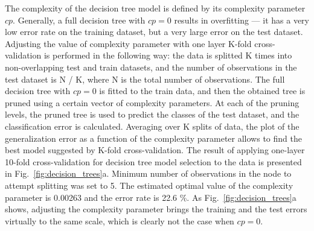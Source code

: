 \documentclass[10pt, paper=a4]{article}
\begin{document}
The complexity of the decision tree model is defined by its complexity
parameter $cp$.  Generally, a full decision tree with $cp = 0$ results
in overfitting --- it has a very low error rate on the training
dataset, but a very large error on the test dataset.  Adjusting the
value of complexity parameter with one layer K-fold cross-validation
is performed in the following way: the data is splitted K times into
non-overlapping test and train datasets, and the number of
observations in the test dataset is N / K, where N is the total number
of observations.  The full decision tree with $cp = 0$ is fitted to
the train data, and then the obtained tree is pruned using a certain
vector of complexity parameters.  At each of the pruning levels, the
pruned tree is used to predict the classes of the test dataset, and
the classification error is calculated.  Averaging over K splits of
data, the plot of the generalization error as a function of the
complexity parameter allows to find the best model suggested by K-fold
cross-validation.  The result of applying one-layer 10-fold
cross-validation for decision tree model selection to the data is
presented in Fig.~\ref{fig:decision_trees}a.  Minimum number of
observations in the node to attempt splitting was set to 5.  The
estimated optimal value of the complexity parameter is 0.00263 and the
error rate is 22.6 \%.  As Fig.~\ref{fig:decision_trees}a shows,
adjusting the complexity parameter brings the training and the test
errors virtually to the same scale, which is clearly not the case when
$cp = 0$.
\end{document}
